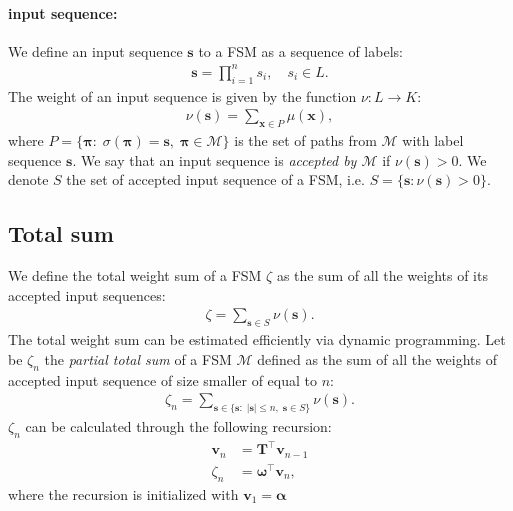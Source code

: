 \paragraph{input sequence:} We define an input sequence $\mathbf{s}$ to
a FSM as a sequence of labels:
\begin{align}
    \mathbf{s} = \prod_{i=1}^n s_i, \quad s_i \in L.
\end{align}
The weight of an input sequence is given by the function
$\nu: L \rightarrow K$:
\begin{align}
    \nu(\mathbf{s}) = \sum_{ \mathbf{x} \in P} \mu(\mathbf{x}),
\end{align}
where $P = \{\boldsymbol{\pi} : \; \sigma(\boldsymbol{\pi}) = \mathbf{s}, \;
\boldsymbol{\pi} \in \mathcal{M} \}$ is the set of paths from
$\mathcal{M}$ with label sequence $\mathbf{s}$.
We say that an input sequence is \emph{accepted by $\mathcal{M}$} if
$\nu(\mathbf{s}) > 0$. We denote $S$ the set of accepted input sequence
of a FSM, i.e. $S = \{\mathbf{s} : \nu(\mathbf{s}) > 0 \}$.

\subsection{Total sum}

We define the total weight sum of a FSM $\zeta$ as the sum of all the
weights of its accepted input sequences:
\begin{align}
    \zeta = \sum_{\mathbf{s} \in S} \nu(\mathbf{s}).
\end{align}
The total weight sum can be estimated efficiently via dynamic
programming. Let be $\zeta_n$ the \emph{partial total sum} of a FSM
$\mathcal{M}$ defined as the sum of all the weights of accepted input
sequence of size smaller of equal to $n$:
\begin{align}
    \zeta_n = \sum_{\mathbf{s} \in
        \{ \mathbf{s} : \; | \mathbf{s} | \le n, \; \mathbf{s} \in S \}}
        \nu(\mathbf{s}).
\end{align}
$\zeta_n$ can be calculated through the following recursion:
\begin{align}
    \mathbf{v}_n &= \mathbf{T}^\top \mathbf{v}_{n-1} \\
    \zeta_n &= \boldsymbol{\omega}^\top \mathbf{v}_n,
\end{align}
where the recursion is initialized with $\mathbf{v}_1 = \boldsymbol{\alpha}$

